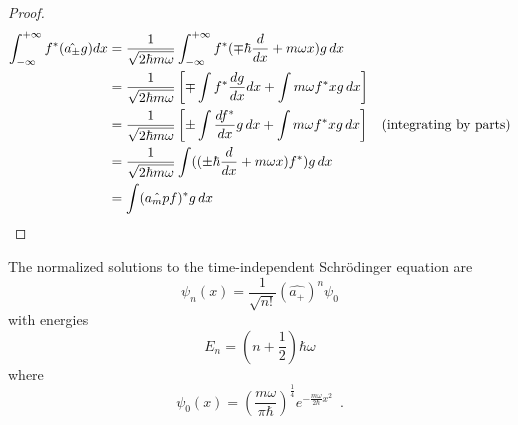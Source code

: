 \begin{proof}
\pf
\begin{align*}
\int_{-\infty}^{+ \infty} f^* (\hat{a_\pm} g) dx
& = \frac{1}{\sqrt{2 \hbar m \omega}} \int_{- \infty}^{+ \infty}
f^* (\mp \hbar \frac{d}{dx} + m \omega x) g \, dx \\
& = \frac{1}{\sqrt{2 \hbar m \omega}} \left[
\mp \int f^* \frac{dg}{dx} dx + \int m \omega f^* x g \, dx \right] \\
& = \frac{1}{\sqrt{2 \hbar m \omega}} \left[ \pm \int \frac{df^*}{dx} g \, dx + \int m \omega f^* x g \, dx \right] & (\text{integrating by parts}) \\
& = \frac{1}{\sqrt{2 \hbar m \omega}} \int ((\pm \hbar \frac{d}{dx} + m \omega x)f^*) g \, dx \\
& = \int (\hat{a_mp} f)^* g \, dx & \qed
\end{align*}
\end{proof}

\begin{prop}
The normalized solutions to the time-independent Schr\"{o}dinger equation are
\[ \psi_n(x) = \frac{1}{\sqrt{n!}} (\hat{a_+})^n \psi_0 \]
with energies
\[ E_n = \left( n + \frac{1}{2} \right) \hbar \omega \]
where
\[ \psi_0(x) = \left( \frac{m \omega}{\pi \hbar} \right)^{\frac{1}{4}} e^{- \frac{m \omega}{2 \hbar} x^2} \enspace . \]
\end{prop}

